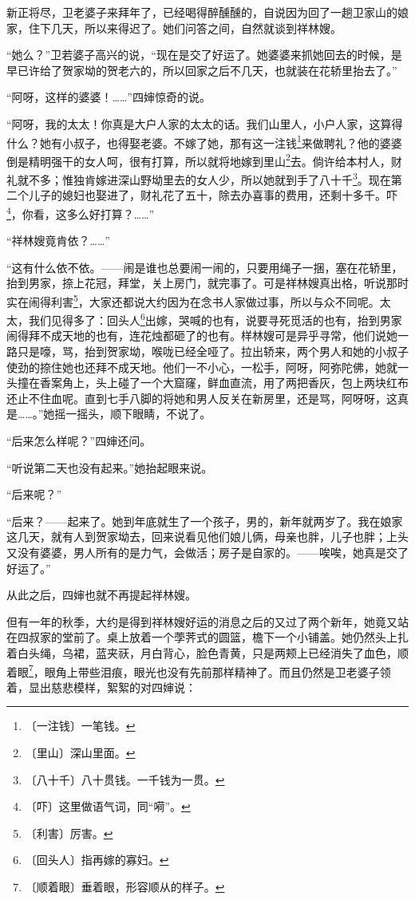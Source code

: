 \documentclass[12pt,UTF-8,openany]{ctexbook}
\begin{document}
\begin{normalsize}
    新正将尽，卫老婆子来拜年了，已经喝得醉醺醺的，自说因为回了一趟卫家山的娘家，住下几天，所以来得迟了。她们问答之间，自然就谈到祥林嫂。
    
    “她么？”卫若婆子高兴的说，“现在是交了好运了。她婆婆来抓她回去的时候，是早已许给了贺家坳的贺老六的，所以回家之后不几天，也就装在花轿里抬去了。”
    
    “阿呀，这样的婆婆！……”四婶惊奇的说。
    
    “阿呀，我的太太！你真是大户人家的太太的话。我们山里人，小户人家，这算得什么？她有小叔子，也得娶老婆。不嫁了她，那有这一注钱\footnote{〔一注钱〕一笔钱。}来做聘礼？他的婆婆倒是精明强干的女人呵，很有打算，所以就将地嫁到里山\footnote{〔里山〕深山里面。}去。倘许给本村人，财礼就不多；惟独肯嫁进深山野坳里去的女人少，所以她就到手了八十千\footnote{〔八十千〕八十贯钱。一千钱为一贯。}。现在第二个儿子的媳妇也娶进了，财礼花了五十，除去办喜事的费用，还剩十多千。吓\footnote{〔吓〕这里做语气词，同“嗬”。}，你看，这多么好打算？……”
    
    “祥林嫂竟肯依？……”
    
    “这有什么依不依。——闹是谁也总要闹一闹的，只要用绳子一捆，塞在花轿里，抬到男家，捺上花冠，拜堂，关上房门，就完事了。可是祥林嫂真出格，听说那时实在闹得利害\footnote{〔利害〕厉害。}，大家还都说大约因为在念书人家做过事，所以与众不同呢。太太，我们见得多了：回头人\footnote{〔回头人〕指再嫁的寡妇。}出嫁，哭喊的也有，说要寻死觅活的也有，抬到男家闹得拜不成天地的也有，连花烛都砸了的也有。样林嫂可是异乎寻常，他们说她一路只是嚎，骂，抬到贺家坳，喉咙已经全哑了。拉出轿来，两个男人和她的小叔子使劲的捺住她也还拜不成天地。他们一不小心，一松手，阿呀，阿弥陀佛，她就一头撞在香案角上，头上碰了一个大窟窿，鲜血直流，用了两把香灰，包上两块红布还止不住血呢。直到七手八脚的将她和男人反关在新房里，还是骂，阿呀呀，这真是……。”她摇一摇头，顺下眼睛，不说了。
    
    “后来怎么样呢？”四婶还问。
    
    “听说第二天也没有起来。”她抬起眼来说。
    
    “后来呢？”
    
    “后来？——起来了。她到年底就生了一个孩子，男的，新年就两岁了。我在娘家这几天，就有人到贺家坳去，回来说看见他们娘儿俩，母亲也胖，儿子也胖；上头又没有婆婆，男人所有的是力气，会做活；房子是自家的。——唉唉，她真是交了好运了。”
    
    从此之后，四婶也就不再提起祥林嫂。
    
    但有一年的秋季，大约是得到祥林嫂好运的消息之后的又过了两个新年，她竟又站在四叔家的堂前了。桌上放着一个荸荠式的圆篮，檐下一个小铺盖。她仍然头上扎着白头绳，乌裙，蓝夹祆，月白背心，脸色青黄，只是两颊上已经消失了血色，顺着眼\footnote{〔顺着眼〕垂着眼，形容顺从的样子。}，眼角上带些泪痕，眼光也没有先前那样精神了。而且仍然是卫老婆子领着，显出慈悲模样，絮絮的对四婶说：
    

\end{normalsize}
\end{document}

